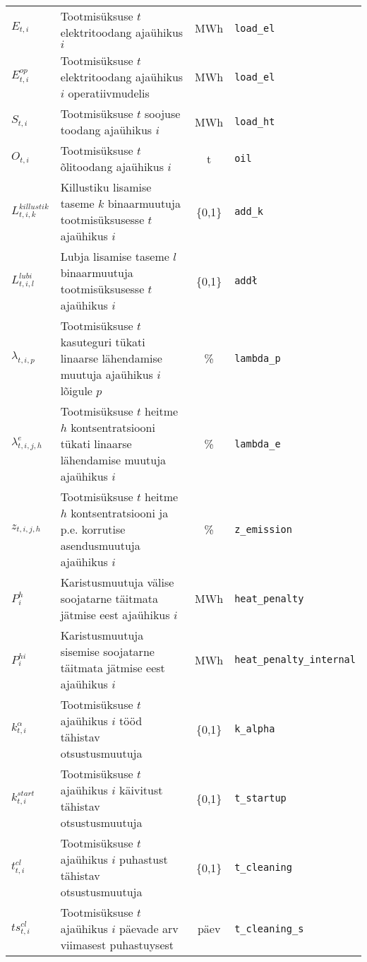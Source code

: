 \begin{landscape}
\begin{table}
\begin{tabular}{l l c l}
$E_{t,i}$ & Tootmisüksuse $t$ elektritoodang ajaühikus $i$ & MWh & \texttt{load\_el}\\
$E^{op}_{t,i}$ & Tootmisüksuse $t$ elektritoodang ajaühikus $i$ operatiivmudelis & MWh & \texttt{load\_el}\\
$S_{t,i}$ & Tootmisüksuse $t$ soojuse toodang ajaühikus $i$ & MWh & \texttt{load\_ht}\\
$O_{t,i}$ & Tootmisüksuse $t$ õlitoodang ajaühikus $i$ & t & \texttt{oil}\\
$L^{killustik}_{t,i,k}$ & Killustiku lisamise taseme $k$ binaarmuutuja tootmisüksusesse $t$ ajaühikus $i$ & \{0,1\} & \texttt{add\_k}\\
$L^{lubi}_{t,i,l}$ & Lubja lisamise taseme $l$ binaarmuutuja tootmisüksusesse $t$ ajaühikus $i$ & \{0,1\} & \texttt{add\l}\\
$\lambda_{t,i,p}$ & Tootmisüksuse $t$ kasuteguri tükati linaarse lähendamise muutuja ajaühikus $i$ lõigule $p$ & \% & \texttt{lambda\_p}\\
$\lambda^e_{t,i,j,h}$ & Tootmisüksuse $t$ heitme $h$ kontsentratsiooni tükati linaarse lähendamise muutuja ajaühikus $i$ & \% & \texttt{lambda\_e}\\
$z_{t,i,j,h}$ & Tootmisüksuse $t$ heitme $h$ kontsentratsiooni ja p.e. korrutise asendusmuutuja ajaühikus $i$ & \% & \texttt{z\_emission}\\

$P^{h}_{i}$ & Karistusmuutuja välise soojatarne täitmata jätmise eest ajaühikus $i$ & MWh & \texttt{heat\_penalty} \\
$P^{hi}_{i}$ & Karistusmuutuja sisemise soojatarne täitmata jätmise eest ajaühikus $i$ & MWh & \texttt{heat\_penalty\_internal} \\

$k^\alpha_{t,i}$ & Tootmisüksuse $t$ ajaühikus $i$ tööd tähistav otsustusmuutuja & \{0,1\} & \texttt{k\_alpha} \\
$k^{start}_{t,i}$ & Tootmisüksuse $t$ ajaühikus $i$ käivitust tähistav otsustusmuutuja & \{0,1\} & \texttt{t\_startup} \\
$t^{cl}_{t,i}$ & Tootmisüksuse $t$ ajaühikus $i$ puhastust tähistav otsustusmuutuja & \{0,1\} & \texttt{t\_cleaning} \\
$ts^{cl}_{t,i}$ & Tootmisüksuse $t$ ajaühikus $i$ päevade arv viimasest puhastuysest & päev & \texttt{t\_cleaning\_s} \\


\end{tabular}
\end{table}
\end{landscape}
